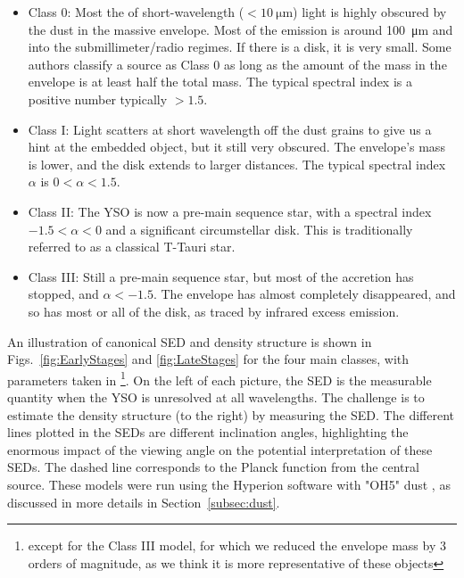 \begin{itemize}
\item Class 0: Most the of short-wavelength ($<\SI{10}{\micro\meter}$) light is highly obscured by the dust in the massive envelope. Most of the emission is around \SI{100}{\micro\meter} and into the submillimeter/radio regimes. If there is a disk, it is very small. Some authors \citep{Dunham:2010bx} classify a source as Class 0 as long as the amount of the mass in the envelope is at least half the total mass. The typical spectral index is a positive number typically $>1.5$.
\item Class I: Light scatters at short wavelength off the dust grains to give us a hint at the embedded object, but it still very obscured. The envelope's mass is lower, and the disk extends to larger distances. The typical spectral index $\alpha$ is $0<\alpha<1.5$.
\item Class II: The YSO is now a pre-main sequence star, with a spectral index $-1.5 < \alpha < 0$ and a significant circumstellar disk. This is traditionally referred to as a classical T-Tauri star.
\item Class III: Still a pre-main sequence star, but most of the accretion has stopped, and $\alpha < -1.5$. The envelope has almost completely disappeared, and so has most or all of the disk, as traced by infrared excess emission. 
\end{itemize}

An illustration of canonical SED and density structure is shown in Figs.~\ref{fig:EarlyStages} and \ref{fig:LateStages} for the four main classes, with parameters taken in \citet{Whitney:2003kc}\footnote{except for the Class III model, for which we reduced the envelope mass by 3 orders of magnitude, as we think it is more representative of these objects}. On the left of each picture, the SED is the measurable quantity when the YSO is unresolved at all wavelengths. The challenge is to estimate the density structure (to the right) by measuring the SED. The different lines plotted in the SEDs are different inclination angles, highlighting the enormous impact of the viewing angle on the potential interpretation of these SEDs. The dashed line corresponds to the Planck function from the central source. These models were run using the Hyperion software \citep{Robitaille:2011fc} with "OH5" dust \citep{Ossenkopf:1994tq}, as discussed in more details in Section~\ref{subsec:dust}.


